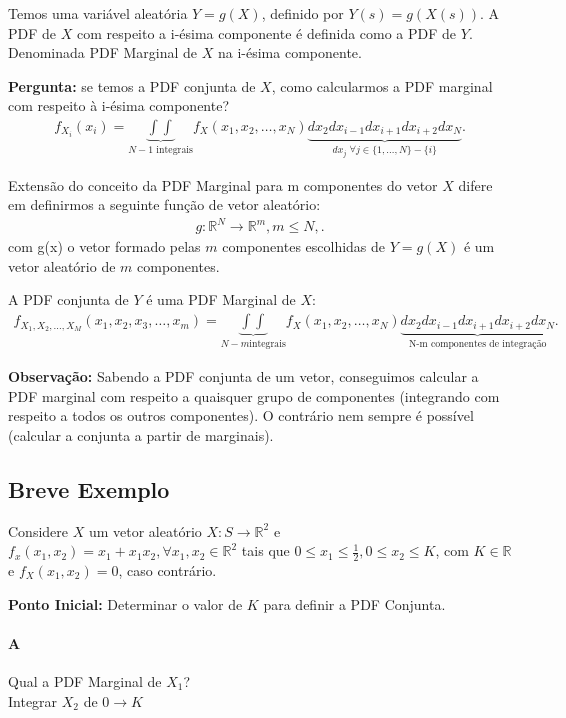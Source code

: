 \documentclass{article}
\renewcommand\bf[1]{\textbf{#1}}
\begin{document}
Temos uma variável aleatória $Y = g(X)$, definido por $Y(s) = g(X(s))$. A PDF de $X$ com respeito a
i-ésima componente é definida como a PDF de $Y$. Denominada PDF Marginal de $X$ na i-ésima
componente.

\bf{Pergunta:} se temos a PDF conjunta de $X$, como calcularmos a PDF marginal com respeito à
i-ésima componente?
\begin{align*}
    f_{X_i}(x_i) = \underbrace{\int \int}_{N-1 \text{ integrais}} f_X(x_1, x_2, \ldots, x_N)
    \underbrace{d x_2 d x_{i-1} d x_{i+1} d x_{i+2} d x_N}_{dx_j \; \forall j \in \{1,\ldots,N\} -
\{i\}}
.\end{align*}

Extensão do conceito da PDF Marginal para m componentes do vetor $X$ difere em definirmos a
seguinte função de vetor aleatório:
\begin{align*}
    g: \mathbb{R}^{N} \to \mathbb{R}^{m}, m \le N,
.\end{align*}
com g(x) o vetor formado pelas $m$ componentes escolhidas de $Y  = g(X)$ é um vetor aleatório
de $m$ componentes.

A PDF conjunta de $Y$ é uma PDF Marginal de $X$:
\begin{align*}
    f_{X_1, X_2, \ldots, X_M}(x_1, x_2, x_3, \ldots, x_m) = \underbrace{\int \int}_{N-m \text{
    integrais}} f_X(x_1, x_2, \ldots, x_N) \underbrace{d x_2 d x_{i-1} d x_{i+1} d x_{i+2} d x_N}_{\text{N-m componentes de
    integração}}
.\end{align*}

\bf{Observação:} Sabendo a PDF conjunta de um vetor, conseguimos calcular a PDF marginal com
respeito a quaisquer grupo de componentes (integrando com respeito a todos os outros
componentes). O contrário nem sempre é possível (calcular a conjunta a partir de marginais).
\\[0.5em]
\subsection*{Breve Exemplo}
Considere $X$ um vetor aleatório $X: S \to \mathbb{R}^{2}$ e $f_x(x_1, x_2) = x_1 + x_1 x_2, \forall
x_1, x_2 \in \mathbb{R}^2$ tais que $0 \le x_1 \le \frac{1}{2}, 0 \le x_2 \le K$, com $K \in
\mathbb{R}$ e $f_X(x_1, x_2) = 0$, caso contrário.

\bf{Ponto Inicial:} Determinar o valor de $K$ para definir a PDF Conjunta.

\paragraph{A} Qual a PDF Marginal de $X_1$?
\\
Integrar $X_2$ de $0 \to K$
\end{document}
